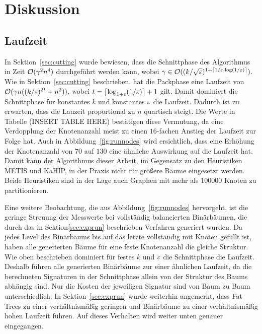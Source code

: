 
\chapter{Diskussion}\label{chapter:diskussion}
\section{Laufzeit}
In Sektion~\ref{sec:cutting} wurde bewiesen, dass die Schnittphase des Algorithmus in Zeit $\mathcal{O}(\gamma^2 n^4)$ durchgeführt werden kann, wobei $\gamma \in \mathcal{O}((k/\sqrt{\varepsilon})^{1+\lceil1/\varepsilon \cdot \log(1/\varepsilon)\rceil})$.
Wie in Sektion~\ref{sec:cutting} beschrieben, hat die Packphase eine Laufzeit von $\mathcal{O}(\gamma n ((k/\varepsilon)^{2t} + n^2))$, wobei $t = \lceil\log_{1 + \varepsilon}(1/\varepsilon)\rceil + 1$ gilt.
Damit dominiert die Schnittphase für konstantes $k$ und konstantes $\varepsilon$ die Laufzeit.
Dadurch ist zu erwarten, dass die Lauzeit proportional zu $n$ quartisch steigt.
Die Werte in Tabelle (INSERT TABLE HERE) bestätigen diese Vermutung, da eine Verdopplung der Knotenanzahl meist zu einen $16$\hyp fachen Anstieg der Laufzeit zur Folge hat.
Auch in Abbildung~\ref{fig:runnodes} wird ersichtlich, dass eine Erhöhung der Knotenanzahl von $70$ auf $130$ eine ähnliche Auswirkung auf die Laufzeit hat.
Damit kann der Algorithmus dieser Arbeit, im Gegensatz zu den Heuristiken METIS und KaHIP, in der Praxis nicht für größere Bäume eingesetzt werden.
Beide Heuristiken sind in der Lage auch Graphen mit mehr als $100000$ Knoten zu partitionieren.~\cite{KK98, SS13}

Eine weitere Beobachtung, die aus Abbildung~\ref{fig:runnodes} hervorgeht, ist die geringe Streuung der Messwerte bei vollständig balancierten Binärbäumen, die durch das in Sektion\ref{sec:exprun} beschrieben Verfahren generiert wurden.
Da jedes Level des Binärbaums bis auf das letzte vollständig mit Knoten gefüllt ist, haben alle generierten Bäume für eine feste Knotenanzahl die gleiche Struktur.
Wie oben beschrieben dominiert für festes $k$ und $\varepsilon$ die Schnittphase die Laufzeit.
Deshalb führen alle generierten Binärbäume zur einer ähnlichen Laufzeit, da die berechneten Signaturen in der Schnittphase allein von der Struktur des Baums abhängig sind.
Nur die Kosten der jeweiligen Signatur sind von Baum zu Baum unterschiedlich.
In Sektion~\ref{sec:exprun} wurde weiterhin angemerkt, dass Fat Trees zu einer verhältnismäßig geringen und Binärbäume zu einer verhältnismäßig hohen Laufzeit führen.
Auf dieses Verhalten wird weiter unten genauer eingegangen.

